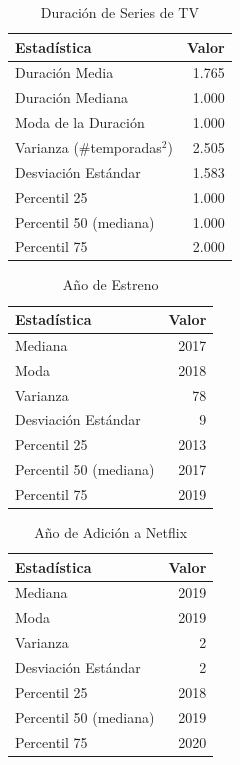 \documentclass{article}
\begin{document}
\begin{table}[H]
    \centering
    \begin{tabular}{|l|r|}
    \hline
    \textbf{Estadística} & \textbf{Valor} \\
    \hline
    Duración Media & 1.765 \\
    Duración Mediana & 1.000 \\
    Moda de la Duración & 1.000 \\
    Varianza (\#temporadas$^2$) & 2.505 \\
    Desviación Estándar & 1.583 \\
    Percentil 25 & 1.000 \\
    Percentil 50 (mediana) & 1.000 \\
    Percentil 75 & 2.000 \\
    \hline
    \end{tabular}
    \caption{Duración de Series de TV}
    \label{tab:estadisticas_duracion_series}
\end{table}

\begin{table}[H]
    \centering
    \begin{tabular}{|l|r|}
    \hline
    \textbf{Estadística} & \textbf{Valor} \\
    \hline
    Mediana & 2017 \\
    Moda & 2018 \\
    Varianza & 78 \\
    Desviación Estándar & 9 \\
    Percentil 25 & 2013 \\
    Percentil 50 (mediana) & 2017 \\
    Percentil 75 & 2019 \\
    \hline
    \end{tabular}
    \caption{Año de Estreno}
    \label{tab:estadisticas_estreno}
\end{table}

\begin{table}[H]
    \centering
    \begin{tabular}{|l|r|}
    \hline
    \textbf{Estadística} & \textbf{Valor} \\
    \hline
    Mediana & 2019 \\
    Moda & 2019 \\
    Varianza & 2 \\
    Desviación Estándar & 2 \\
    Percentil 25 & 2018 \\
    Percentil 50 (mediana) & 2019 \\
    Percentil 75 & 2020 \\
    \hline
    \end{tabular}
    \caption{Año de Adición a  Netflix}
    \label{tab:estadisticas_adicion}
\end{table}
\end{document}
